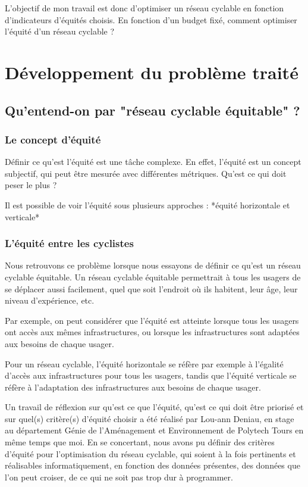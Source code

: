 \documentclass[a4paper,12pt,french]{article}
\begin{document}
L'objectif de mon travail est donc d'optimiser un réseau cyclable en fonction d'indicateurs d'équités choisis. En fonction d'un budget fixé, comment optimiser l'équité d'un réseau cyclable ?

\section{Développement du problème traité}

\subsection{Qu'entend-on par "réseau cyclable équitable" ?}

\subsubsection{Le concept d'équité}

Définir ce qu'est l'équité est une tâche complexe. En effet, l'équité est un concept subjectif, qui peut être mesurée avec différentes métriques. Qu'est ce qui doit peser le plus ?

Il est possible de voir l'équité sous plusieurs approches : *équité horizontale et verticale*

\subsubsection{L'équité entre les cyclistes}

Nous retrouvons ce problème lorsque nous essayons de définir ce qu'est un réseau cyclable équitable. Un réseau cyclable équitable permettrait à tous les usagers de se déplacer aussi facilement, quel que soit l'endroit où ils habitent, leur âge, leur niveau d'expérience, etc. 

Par exemple, on peut considérer que l'équité est atteinte lorsque tous les usagers ont accès aux mêmes infrastructures, ou lorsque les infrastructures sont adaptées aux besoins de chaque usager.

Pour un réseau cyclable, l'équité horizontale se réfère par exemple à l'égalité d'accès aux infrastructures pour tous les usagers, tandis que l'équité verticale se réfère à l'adaptation des infrastructures aux besoins de chaque usager.



Un travail de réflexion sur qu'est ce que l'équité, qu'est ce qui doit être priorisé et sur quel(s) critère(s) d'équité choisir a été réalisé par Lou-ann Deniau, en stage au département Génie de l'Aménagement et Environnement de Polytech Tours en même temps que moi. En se concertant, nous avons pu définir des critères d'équité pour l'optimisation du réseau cyclable, qui soient à la fois pertinents et réalisables informatiquement, en fonction des données présentes, des données que l'on peut croiser, de ce qui ne soit pas trop dur à programmer.
\end{document}
